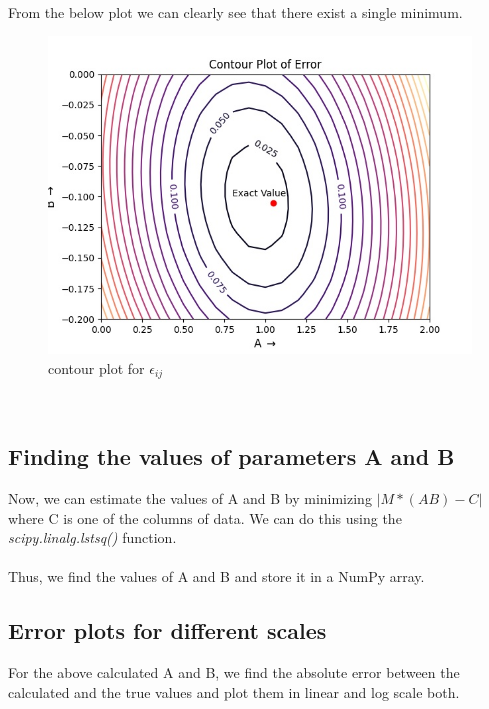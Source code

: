 \documentclass[11pt, a4paper]{article}
\begin{document}
\noindent
\\
From the below plot we can clearly see that there exist a single minimum.
\\
\begin{figure}[!tbh]
   	\centering
   	\includegraphics[scale=0.7]{plots/Ques8.jpg}  %
   	\caption{contour plot for $\epsilon_{ij}$ }
   	\label{fig:Contour plot}
   \end{figure}
\\
\newpage
\subsection{Finding the values of parameters A and B}
\par Now, we can estimate the values of A and B by minimizing $|M*(AB)-C|$ where C is one of the columns of data. We can do this using the \emph{scipy.linalg.lstsq()} function.\\~\\
Thus, we find the values of A and B and store it in a NumPy array.

\subsection{Error plots for different scales}
\par For the above calculated A and B, we find the absolute error between the calculated and the true values and plot them in linear and log scale both.
\end{document}
